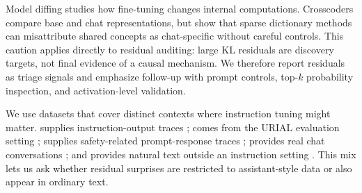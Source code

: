 Model diffing studies how fine-tuning changes internal computations. Crosscoders compare base and chat representations, but \citet{minder2025crosscoders} show that sparse dictionary methods can misattribute shared concepts as chat-specific without careful controls. This caution applies directly to residual auditing: large KL residuals are discovery targets, not final evidence of a causal mechanism. We therefore report residuals as triage signals and emphasize follow-up with prompt controls, top-$k$ probability inspection, and activation-level validation.

We use datasets that cover distinct contexts where instruction tuning might matter. \alpaca supplies instruction-output traces \citep{taori2023alpaca}; \justeval comes from the URIAL evaluation setting \citep{lin2023unlocking}; \beavertails supplies safety-related prompt-response traces \citep{ji2023beavertails}; \arena provides real chat conversations \citep{zheng2023judging}; and \wikitext provides natural text outside an instruction setting \citep{merity2016pointer}. This mix lets us ask whether residual surprises are restricted to assistant-style data or also appear in ordinary text.

